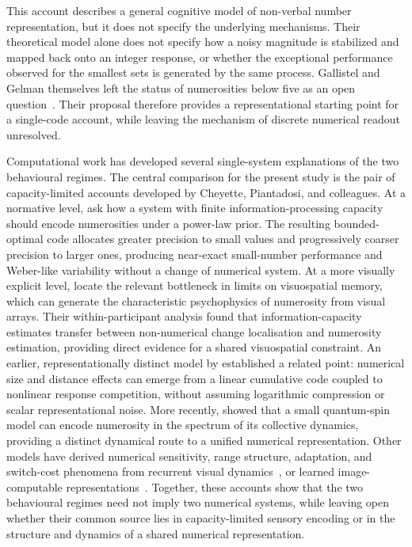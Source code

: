 \documentclass[Afour,sageh,times]{sagej}
\begin{document}
This account describes a general cognitive model of non-verbal number representation, but it does not specify the underlying mechanisms. Their theoretical model alone does not specify how a noisy magnitude is stabilized and mapped back onto an integer response, or whether the exceptional performance observed for the smallest sets is generated by the same process. Gallistel and Gelman themselves left the status of numerosities below five as an open question~\citep{gallistel_non-verbal_2000}. Their proposal therefore provides a representational starting point for a single-code account, while leaving the mechanism of discrete numerical readout unresolved.

Computational work has developed several single-system explanations of the two behavioural regimes. The central comparison for the present study is the pair of capacity-limited accounts developed by Cheyette, Piantadosi, and colleagues. At a normative level, \citet{cheyette_unified_2020} ask how a system with finite information-processing capacity should encode numerosities under a power-law prior. The resulting bounded-optimal code allocates greater precision to small values and progressively coarser precision to larger ones, producing near-exact small-number performance and Weber-like variability without a change of numerical system. At a more visually explicit level, \citet{cheyette_limited_2024} locate the relevant bottleneck in limits on visuospatial memory, which can generate the characteristic psychophysics of numerosity from visual arrays. Their within-participant analysis found that information-capacity estimates transfer between non-numerical change localisation and numerosity estimation, providing direct evidence for a shared visuospatial constraint. An earlier, representationally distinct model by \citet{zorzi_computational_1999} established a related point: numerical size and distance effects can emerge from a linear cumulative code coupled to nonlinear response competition, without assuming logarithmic compression or scalar representational noise. More recently, \citet{malo_quantum_2023} showed that a small quantum-spin model can encode numerosity in the spectrum of its collective dynamics, providing a distinct dynamical route to a unified numerical representation. Other models have derived numerical sensitivity, range structure, adaptation, and switch-cost phenomena from recurrent visual dynamics~\citep{sengupta_visual_2014,sengupta_big_2017,verma_emergence_2023}, or learned image-computable representations~\citep{stoianov_emergence_2012,testolin_visual_2020}. Together, these accounts show that the two behavioural regimes need not imply two numerical systems, while leaving open whether their common source lies in capacity-limited sensory encoding or in the structure and dynamics of a shared numerical representation.
\end{document}
